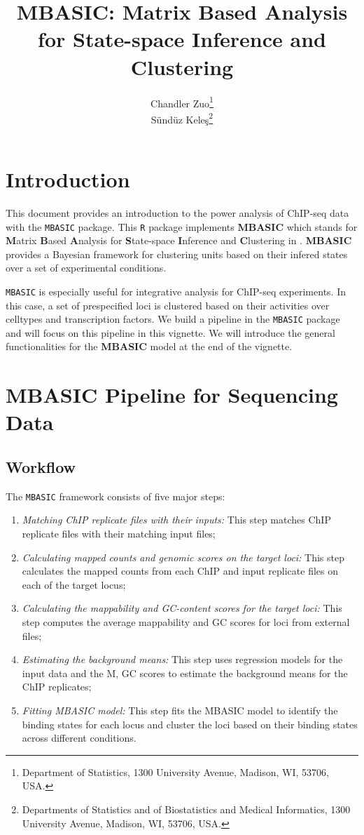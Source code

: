 \documentclass[a4paper,10pt]{article}
\title{MBASIC: Matrix Based Analysis for State-space Inference and Clustering}
\author{Chandler Zuo\footnote{Department of Statistics, 1300 University Avenue, Madison, WI, 53706, USA.}  \\ 
S\"und\"uz Kele\c{s}\footnote{Departments of Statistics and of  Biostatistics and Medical Informatics, 1300 University Avenue, Madison, WI, 53706, USA.}}
\date{}
\begin{document}
\maketitle

\tableofcontents

\section{Introduction}

This document provides an introduction to the power analysis of ChIP-seq data with
the \texttt{MBASIC} package. This \texttt{R} package implements \textbf{MBASIC} which stands for \textbf{M}atrix \textbf{B}ased \textbf{A}nalysis for \textbf{S}tate-space \textbf{I}nference and \textbf{C}lustering in \cite{zuo14}. \textbf{MBASIC} provides a Bayesian framework for clustering units based on their infered states over a set of experimental conditions.

\texttt{MBASIC} is especially useful for integrative analysis for ChIP-seq experiments. In this case, a set of prespecified loci is clustered based on their activities over celltypes and transcription factors. We build a pipeline in the \texttt{MBASIC} package and will focus on this pipeline in this vignette. We will introduce the general functionalities for the \textbf{MBASIC} model at the end of the vignette.

\section{MBASIC Pipeline for Sequencing Data}

\subsection{Workflow}

The \texttt{MBASIC} framework consists of five major steps:

\begin{enumerate}
  \item \textit{Matching ChIP replicate files with their inputs:} This step matches ChIP replicate files with their matching input files;
  \item \textit{Calculating mapped counts and genomic scores on the target loci:} This step calculates the mapped counts from each ChIP and input replicate files on each of the target locus;
  \item \textit{Calculating the mappability and GC-content scores for the target loci:} This step computes the average mappability and GC scores for loci from external files;
  \item \textit{Estimating the background means:} This step uses regression models for the input data and the M, GC scores to estimate the background means for the ChIP replicates;
  \item \textit{Fitting MBASIC model:} This step fits the MBASIC model to identify the binding states for each locus and cluster the loci based on their binding states across different conditions.
\end{enumerate}
\end{document}
